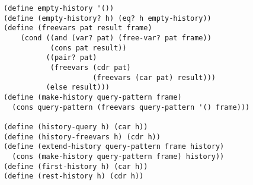 \documentclass[a4paper,12pt]{article}
\begin{document}
\begin{lstlisting}
(define empty-history '())
(define (empty-history? h) (eq? h empty-history))
(define (freevars pat result frame)
    (cond ((and (var? pat) (free-var? pat frame))
           (cons pat result))
          ((pair? pat)
           (freevars (cdr pat)
                     (freevars (car pat) result)))
          (else result)))
(define (make-history query-pattern frame)
  (cons query-pattern (freevars query-pattern '() frame)))

(define (history-query h) (car h))
(define (history-freevars h) (cdr h))
(define (extend-history query-pattern frame history)
  (cons (make-history query-pattern frame) history))
(define (first-history h) (car h))
(define (rest-history h) (cdr h))
\end{lstlisting}
\end{document}
